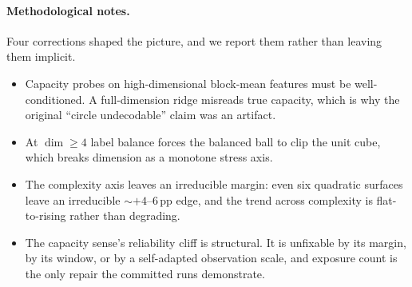 \documentclass[preprint,12pt]{elsarticle}
\begin{document}
\paragraph{Methodological notes.} Four corrections shaped the picture, and we
report them rather than leaving them implicit.
\begin{itemize}[leftmargin=1.4em,itemsep=2pt,topsep=2pt]
\item Capacity probes on high-dimensional block-mean features must be
well-conditioned. A full-dimension ridge misreads true capacity, which is why
the original ``circle undecodable'' claim was an artifact.
\item At $\dim\geq4$ label balance forces the balanced ball to clip the unit
cube, which breaks dimension as a monotone stress axis.
\item The complexity axis leaves an irreducible margin: even six quadratic
surfaces leave an irreducible $\sim+4$--$6$\,pp edge, and the trend across
complexity is flat-to-rising rather than degrading.
\item The capacity sense's reliability cliff is structural. It is unfixable by
its margin, by its window, or by a self-adapted observation scale, and
exposure count is the only repair the committed runs demonstrate.
\end{itemize}
\end{document}
